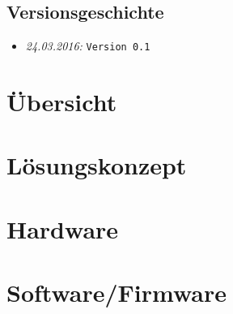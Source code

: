 \documentclass{fhnwreport/fhnwreport}
\begin{document}


\tableofcontents
\vspace{60mm}
\subsection*{Versionsgeschichte}
\begin{itemize}
    \item[]
        \emph{24.03.2016:} \texttt{Version 0.1}
\end{itemize}
\clearpage

\section{\"Ubersicht}
\label{sec:ubersicht}


%

\clearpage
\section{L\"osungskonzept}
\label{sec:losungskonzept}


\clearpage
\section{Hardware}
\label{sec:hardware}


\clearpage
\section{Software/Firmware}
\label{sec:software}

\end{document}
